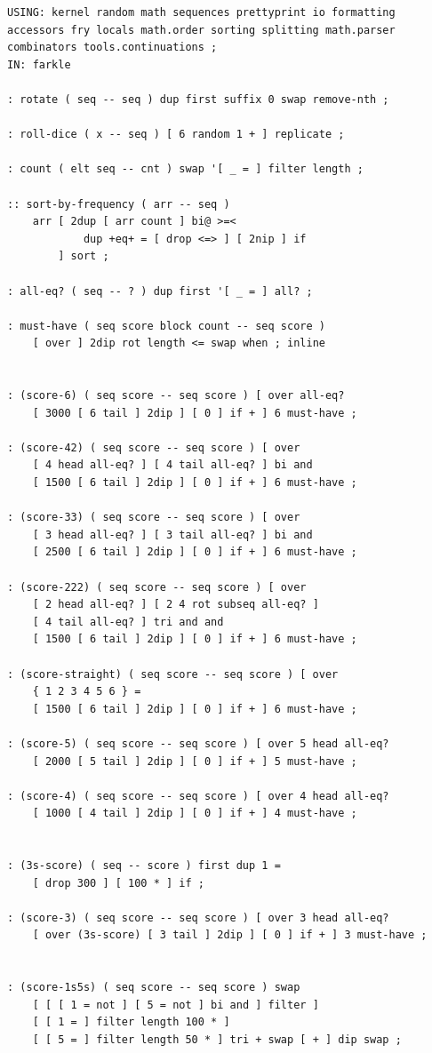 \documentclass{article}
\begin{document}
\begin{verbatim}
USING: kernel random math sequences prettyprint io formatting
accessors fry locals math.order sorting splitting math.parser
combinators tools.continuations ;
IN: farkle

: rotate ( seq -- seq ) dup first suffix 0 swap remove-nth ;

: roll-dice ( x -- seq ) [ 6 random 1 + ] replicate ;

: count ( elt seq -- cnt ) swap '[ _ = ] filter length ;

:: sort-by-frequency ( arr -- seq )
    arr [ 2dup [ arr count ] bi@ >=<
            dup +eq+ = [ drop <=> ] [ 2nip ] if
        ] sort ;
    
: all-eq? ( seq -- ? ) dup first '[ _ = ] all? ;

: must-have ( seq score block count -- seq score )
    [ over ] 2dip rot length <= swap when ; inline
    

: (score-6) ( seq score -- seq score ) [ over all-eq?
    [ 3000 [ 6 tail ] 2dip ] [ 0 ] if + ] 6 must-have ;

: (score-42) ( seq score -- seq score ) [ over
    [ 4 head all-eq? ] [ 4 tail all-eq? ] bi and
    [ 1500 [ 6 tail ] 2dip ] [ 0 ] if + ] 6 must-have ;

: (score-33) ( seq score -- seq score ) [ over
    [ 3 head all-eq? ] [ 3 tail all-eq? ] bi and
    [ 2500 [ 6 tail ] 2dip ] [ 0 ] if + ] 6 must-have ;

: (score-222) ( seq score -- seq score ) [ over
    [ 2 head all-eq? ] [ 2 4 rot subseq all-eq? ]
    [ 4 tail all-eq? ] tri and and
    [ 1500 [ 6 tail ] 2dip ] [ 0 ] if + ] 6 must-have ;

: (score-straight) ( seq score -- seq score ) [ over
    { 1 2 3 4 5 6 } =
    [ 1500 [ 6 tail ] 2dip ] [ 0 ] if + ] 6 must-have ;

: (score-5) ( seq score -- seq score ) [ over 5 head all-eq?
    [ 2000 [ 5 tail ] 2dip ] [ 0 ] if + ] 5 must-have ;

: (score-4) ( seq score -- seq score ) [ over 4 head all-eq?
    [ 1000 [ 4 tail ] 2dip ] [ 0 ] if + ] 4 must-have ;


: (3s-score) ( seq -- score ) first dup 1 =
    [ drop 300 ] [ 100 * ] if ;

: (score-3) ( seq score -- seq score ) [ over 3 head all-eq?
    [ over (3s-score) [ 3 tail ] 2dip ] [ 0 ] if + ] 3 must-have ;


: (score-1s5s) ( seq score -- seq score ) swap
    [ [ [ 1 = not ] [ 5 = not ] bi and ] filter ]
    [ [ 1 = ] filter length 100 * ] 
    [ [ 5 = ] filter length 50 * ] tri + swap [ + ] dip swap ;



\end{verbatim}
\end{document}
